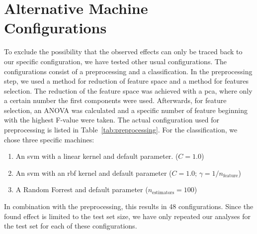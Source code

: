 \section{Alternative Machine Configurations}
\label{cha:alternative-machine-configurations}
To exclude the possibility that the observed effects can only be traced back to our specific configuration, we have tested other usual configurations. The configurations consist of a preprocessing and a classification. In the preprocessing step, we used a method for reduction of feature space and a method for features selection. The reduction of the feature space was achieved with a \ac{pca}, where only a certain number the first components were used. Afterwards, for feature selection, an ANOVA was calculated and a specific number of feature beginning with the highest F-value were taken. The actual configuration used for preprocessing is listed in Table~\ref{tab:preprocessing}.
For the classification, we chose three specific machines:
\begin{enumerate}
    \item An \ac{svm} with a linear kernel and default parameter. ($C = \num{1.0}$)
    \item An \ac{svm} with an \ac{rbf} kernel and default parameter ($C = \num{1.0}$; $\gamma = 1/n_\text{feature}$)
    \item A Random Forrest and default parameter ($n_\text{estimators}=\num{100}$)
\end{enumerate}

In combination with the preprocessing, this results in 48 configurations. Since the found effect is limited to the test set size, we have only repeated our analyses for the test set for each of these configurations.


